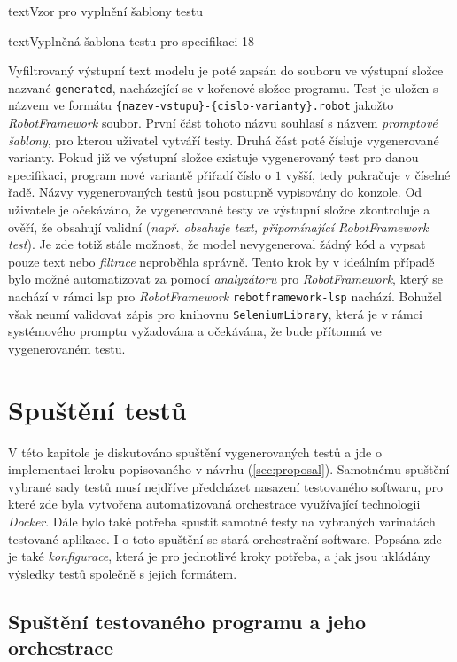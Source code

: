 \documentclass[czech, ma, kiv, he, iso690numb, pdf, viewonly]{fasthesis}
\begin{document}
\begin{code}{text}{Vzor pro vyplnění šablony testu \label{lst:template}}
{\begin{code}{text}{Vyplněná šablona testu pro specifikaci 18 \label{lst:spec18}}
{        \newpage
        Vyfiltrovaný výstupní text modelu je poté zapsán do souboru ve výstupní složce nazvané \verb|generated|, nacházející se v kořenové složce programu. Test je uložen s názvem ve formátu \verb|{nazev-vstupu}-{cislo-varianty}.robot| jakožto \textit{RobotFramework} soubor. První část tohoto názvu souhlasí s názvem \textit{promptové šablony}, pro kterou uživatel vytváří testy. Druhá část poté čísluje vygenerované varianty. Pokud již ve výstupní složce existuje vygenerovaný test pro danou specifikaci, program nové variantě přiřadí číslo o \(1\) vyšší, tedy pokračuje v číselné řadě. Názvy vygenerovaných testů jsou postupně vypisovány do konzole. Od uživatele je očekáváno, že vygenerované testy ve výstupní složce zkontroluje a ověří, že obsahují validní (\textit{např. obsahuje text, připomínající RobotFramework test}). Je zde totiž stále možnost, že model nevygeneroval žádný kód a vypsat pouze text nebo \textit{filtrace} neproběhla správně. Tento krok by v ideálním případě bylo možné automatizovat za pomocí \textit{analyzátoru} pro \textit{RobotFramework}, který se nachází v rámci \Gls{lsp} pro \textit{RobotFramework} \verb|rebotframework-lsp| nachází. Bohužel však neumí validovat zápis pro knihovnu \verb|SeleniumLibrary|, která je v rámci systémového promptu vyžadována a očekávána, že bude přítomná ve vygenerovaném testu.

\chapter{Spuštění testů}
 
    V této kapitole je diskutováno spuštění vygenerovaných testů a jde o implementaci kroku popisovaného v návrhu (\ref{sec:proposal}). Samotnému spuštění vybrané sady testů musí nejdříve předcházet nasazení testovaného softwaru, pro které zde byla vytvořena automatizovaná orchestrace využívající technologii \textit{Docker}. Dále bylo také potřeba spustit samotné testy na vybraných varinatách testované aplikace. I o toto spuštění se stará orchestrační software. Popsána zde je také \emph{konfigurace}, která je pro jednotlivé kroky potřeba, a jak jsou ukládány výsledky testů společně s jejich formátem.

    \section{Spuštění testovaného programu a jeho orchestrace}

}
\end{code}}
\end{code}
\end{document}
